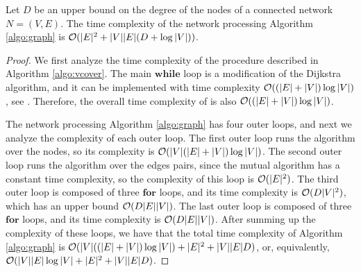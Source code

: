 \begin{proposition}
Let $D$ be an upper bound on the degree of the nodes of a connected network $N=(V,E)$.
The time complexity of the network processing Algorithm \ref{algo:graph} is  %
${{\mathcal{O}(|E|^2+|V||E|(D+\log |V|))}}$.
\end{proposition}
\begin{proof}

We first analyze the time complexity of the procedure \ncalgo{} described in Algorithm \ref{algo:vcover}. The  main $\textbf{while}$ loop is a modification of the Dijkstra algorithm, and it can be implemented with time complexity ${{\mathcal{O}((|E|+|V|)\log |V|)}}$, see \cite{cormen2009introduction}. Therefore, the overall time complexity of \ncalgo{} is also ${{\mathcal{O}((|E|+ |V|)\log |V|)}}$.

The network processing Algorithm \ref{algo:graph} has four  outer  loops, and next we analyze the complexity of each outer loop.  The first outer loop runs the \ncalgo{} algorithm over the nodes, so its complexity is ${{\mathcal{O}(|V|(|E|+ |V|)\log |V|)}}$. The second outer loop  runs the \malgo{} algorithm over the edges pairs, since the mutual algorithm has a constant time complexity, so the complexity of this loop is ${\mathcal{O}(|E|^2)}$. The third outer loop is composed of three $\textbf{for}$ loops, and its time complexity is ${\mathcal{O}(D|V|^2)}$, which has an upper bound ${\mathcal{O}(D|E||V|)}$.  The last outer loop is composed of three $\textbf{for}$ loops, and its time complexity is ${\mathcal{O}(D|E||V|)}$.  After summing up the complexity of these loops, we have that the total time complexity of Algorithm \ref{algo:graph} is  ${{\mathcal{O}(|V|((|E|+|V|)\log |V|)+|E|^2+|V||E|D)}}$, or, equivalently,
${{\mathcal{O}(|V||E|\log |V|+|E|^2+|V||E|D)}}$.

\end{proof}



